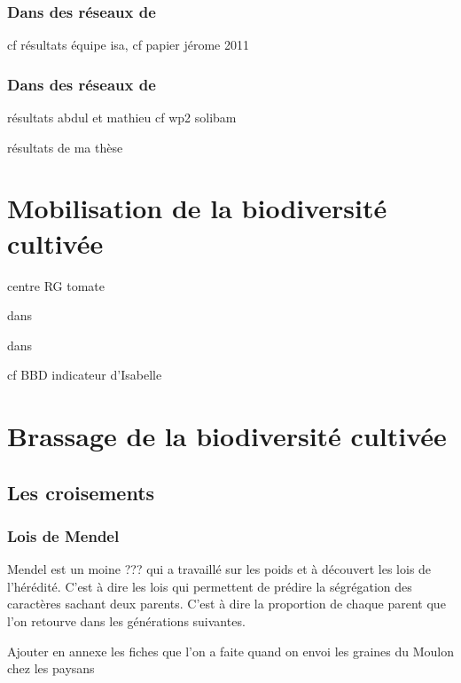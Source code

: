 \subsubsection{Dans des réseaux de \CRBs}

cf résultats équipe isa, cf papier jérome 2011

\subsubsection{Dans des réseaux de \MSPs}

résultats abdul et mathieu cf wp2 solibam

résultats de ma thèse


\section{Mobilisation de la biodiversité cultivée}

centre RG tomate


dans \CRBs

dans \MSPs

cf BBD indicateur d'Isabelle

\section{Brassage de la biodiversité cultivée}

\subsection{Les croisements}

\subsubsection{Lois de Mendel}

Mendel est un moine ??? qui a travaillé sur les poids et à découvert les lois de l'hérédité.
C'est à dire les lois qui permettent de prédire la ségrégation des caractères sachant deux parents.
C'est à dire la proportion de chaque parent que l'on retourve dans les générations suivantes.


Ajouter en annexe les fiches que l'on a faite quand on envoi les graines du Moulon chez les paysans


